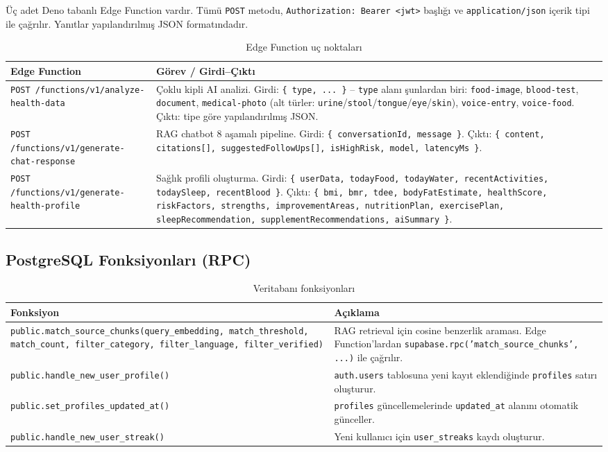 Üç adet Deno tabanlı Edge Function vardır. Tümü \texttt{POST} metodu, \texttt{Authorization: Bearer <jwt>} başlığı ve \texttt{application/json} içerik tipi ile çağrılır. Yanıtlar yapılandırılmış JSON formatındadır.

\begin{table}[H]
\centering
\caption{Edge Function uç noktaları}
\label{tab:edge_fns}
\small
\begin{tabular}{|l|p{}|}
\hline
\textbf{Edge Function} & \textbf{Görev / Girdi--Çıktı} \\
\hline
\texttt{POST /functions/v1/analyze-health-data} &
Çoklu kipli AI analizi. Girdi: \texttt{\{ type, ... \}} -- \texttt{type} alanı şunlardan biri: \texttt{food-image}, \texttt{blood-test}, \texttt{document}, \texttt{medical-photo} (alt türler: \texttt{urine}/\texttt{stool}/\texttt{tongue}/\texttt{eye}/\texttt{skin}), \texttt{voice-entry}, \texttt{voice-food}. Çıktı: tipe göre yapılandırılmış JSON. \\
\hline
\texttt{POST /functions/v1/generate-chat-response} &
RAG chatbot 8 aşamalı pipeline. Girdi: \texttt{\{ conversationId, message \}}. Çıktı: \texttt{\{ content, citations[], suggestedFollowUps[], isHighRisk, model, latencyMs \}}. \\
\hline
\texttt{POST /functions/v1/generate-health-profile} &
Sağlık profili oluşturma. Girdi: \texttt{\{ userData, todayFood, todayWater, recentActivities, todaySleep, recentBlood \}}. Çıktı: \texttt{\{ bmi, bmr, tdee, bodyFatEstimate, healthScore, riskFactors, strengths, improvementAreas, nutritionPlan, exercisePlan, sleepRecommendation, supplementRecommendations, aiSummary \}}. \\
\hline
\end{tabular}
\end{table}

\subsection{PostgreSQL Fonksiyonları (RPC)}

\begin{table}[H]
\centering
\caption{Veritabanı fonksiyonları}
\label{tab:db_fns}
\begin{tabular}{|l|p{}|}
\hline
\textbf{Fonksiyon} & \textbf{Açıklama} \\
\hline
\texttt{public.match\_source\_chunks(query\_embedding, match\_threshold, match\_count, filter\_category, filter\_language, filter\_verified)} & RAG retrieval için cosine benzerlik araması. Edge Function'lardan \texttt{supabase.rpc('match\_source\_chunks', ...)} ile çağrılır. \\
\texttt{public.handle\_new\_user\_profile()} & \texttt{auth.users} tablosuna yeni kayıt eklendiğinde \texttt{profiles} satırı oluşturur. \\
\texttt{public.set\_profiles\_updated\_at()} & \texttt{profiles} güncellemelerinde \texttt{updated\_at} alanını otomatik günceller. \\
\texttt{public.handle\_new\_user\_streak()} & Yeni kullanıcı için \texttt{user\_streaks} kaydı oluşturur. \\
\hline
\end{tabular}
\end{table}

